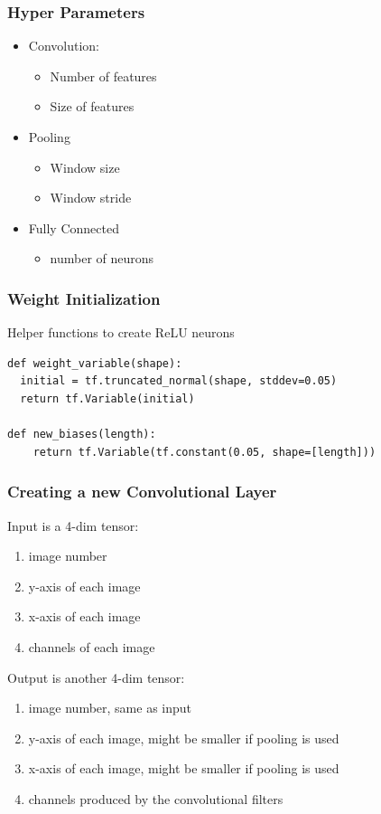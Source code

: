 \documentclass[11pt]{article}
\begin{document}
\subsubsection*{Hyper Parameters}
\label{sec:orga1d769f}
\begin{itemize}
\item Convolution:
\begin{itemize}
\item Number of features
\item Size of features
\end{itemize}
\item Pooling
\begin{itemize}
\item Window size
\item Window stride
\end{itemize}
\item Fully Connected
\begin{itemize}
\item number of neurons
\end{itemize}
\end{itemize}
\subsubsection*{Weight Initialization}
\label{sec:org3a7cbf2}
Helper functions to create ReLU neurons

\begin{verbatim}
def weight_variable(shape):
  initial = tf.truncated_normal(shape, stddev=0.05)
  return tf.Variable(initial)

def new_biases(length):
    return tf.Variable(tf.constant(0.05, shape=[length]))
\end{verbatim}
\subsubsection*{Creating a new Convolutional Layer}
\label{sec:org923efce}

Input is a 4-dim tensor:
\begin{enumerate}
\item image number
\item y-axis of each image
\item x-axis of each image
\item channels of each image
\end{enumerate}

Output is another 4-dim tensor:
\begin{enumerate}
\item image number, same as input
\item y-axis of each image, might be smaller if pooling is used
\item x-axis of each image, might be smaller if pooling is used
\item channels produced by the convolutional filters
\end{enumerate}
\end{document}
